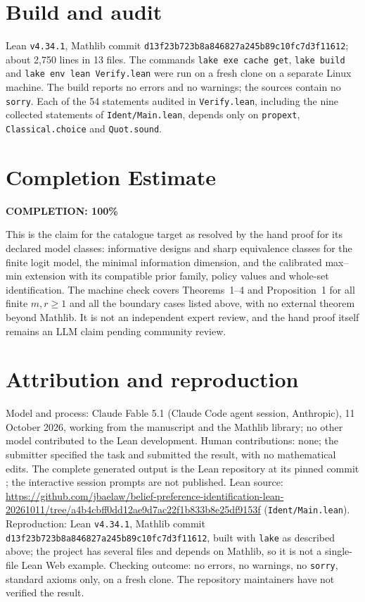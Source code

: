 \documentclass[11pt]{article}
\begin{document}
\section{Build and audit}

Lean \texttt{v4.34.1}, Mathlib commit \texttt{d13f23b723b8a846827a245b89c10fc7d3f11612}; about 2,750 lines in 13 files. The commands \texttt{lake exe cache get}, \texttt{lake build} and \texttt{lake env lean Verify.lean} were run on a fresh clone on a separate Linux machine. The build reports no errors and no warnings; the sources contain no \texttt{sorry}. Each of the 54 statements audited in \texttt{Verify.lean}, including the nine collected statements of \texttt{Ident/Main.lean}, depends only on \texttt{propext}, \texttt{Classical.choice} and \texttt{Quot.sound}.

\section{Completion Estimate}
\noindent\textbf{COMPLETION: 100\%}

This is the claim for the catalogue target as resolved by the hand proof for its declared model classes: informative designs and sharp equivalence classes for the finite logit model, the minimal information dimension, and the calibrated max--min extension with its compatible prior family, policy values and whole-set identification. The machine check covers Theorems~1--4 and Proposition~1 for all finite $m,r\ge1$ and all the boundary cases listed above, with no external theorem beyond Mathlib. It is not an independent expert review, and the hand proof itself remains an LLM claim pending community review.

\section*{Attribution and reproduction}
Model and process: Claude Fable 5.1 (Claude Code agent session, Anthropic), 11 October 2026, working from the manuscript \cite{Hand} and the Mathlib library; no other model contributed to the Lean development. Human contributions: none; the submitter specified the task and submitted the result, with no mathematical edits. The complete generated output is the Lean repository at its pinned commit \cite{Lean}; the interactive session prompts are not published. Lean source: \url{https://github.com/jbaelaw/belief-preference-identification-lean-20261011/tree/a4b4cbff0dd12ae9d7ac22f1b833b8e25df9153f} (\texttt{Ident/Main.lean}). Reproduction: Lean \texttt{v4.34.1}, Mathlib commit \texttt{d13f23b723b8a846827a245b89c10fc7d3f11612}, built with \texttt{lake} as described above; the project has several files and depends on Mathlib, so it is not a single-file Lean Web example. Checking outcome: no errors, no warnings, no \texttt{sorry}, standard axioms only, on a fresh clone. The repository maintainers have not verified the result.
\end{document}
